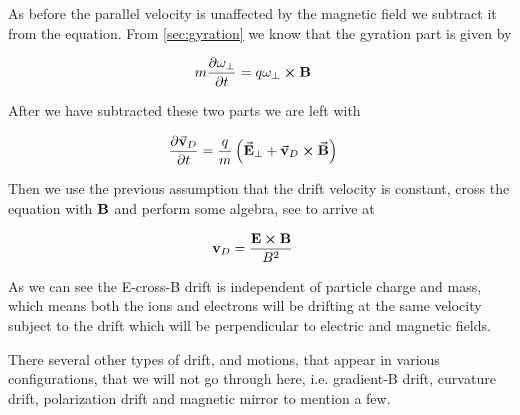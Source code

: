 	As before the parallel velocity is unaffected by the magnetic field we subtract
	it from the equation. From \cref{sec:gyration} we know that the gyration
	part is given by

	\begin{align}
		m\pdv{\vb{\omega}_\perp}{t} &= q\vb{\vb{\omega}_\perp}\cross\vb{B}
	\end{align}

	After we have subtracted these two parts we are left with

	\begin{align}
		\pdv{\va{v}_D}{t} &= \frac{q}{m} \left( \va{E}_\perp + \va{v}_D \cross \va{B} \right)
	\end{align}

	Then we use the previous assumption that the drift velocity is constant,
	cross the equation with \(\vb{B}\) and perform some algebra, see \citet{goldston_introduction_1995} to arrive at

	\begin{align}
		\vb{v}_D &= \frac{\vb{E}\cross\vb{B}}{B^2}
	\end{align}

	As we can see the E-cross-B drift is independent of particle charge and mass,
	which means both the ions and electrons will be drifting at the same velocity
	subject to the drift which will be perpendicular to electric and magnetic fields.

	There several other types of drift, and motions, that appear in various configurations,
	that we will not go through here, i.e. gradient-B drift, curvature drift, polarization drift and magnetic mirror
	to mention a few.
